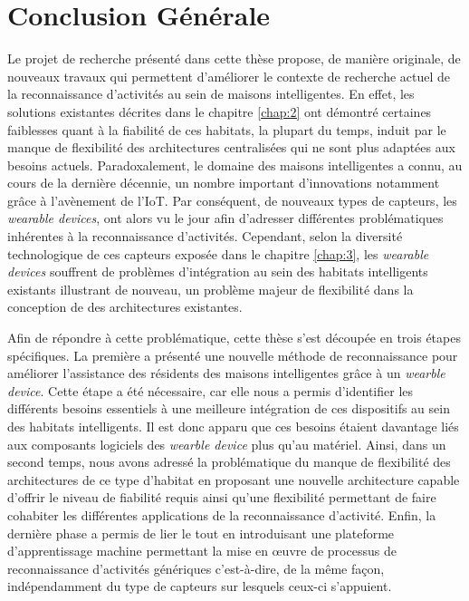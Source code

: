 \chapter{Conclusion Générale}
\label{chap:conclusion}

Le projet de recherche présenté dans cette thèse propose, de manière originale, de nouveaux travaux qui permettent d'améliorer le contexte de recherche actuel de la reconnaissance d'activités au sein de maisons intelligentes. En effet, les solutions existantes décrites dans le chapitre \ref{chap:2} ont démontré certaines faiblesses quant à la fiabilité de ces habitats, la plupart du temps, induit par le manque de flexibilité des architectures centralisées qui ne sont plus adaptées aux besoins actuels. Paradoxalement, le domaine des maisons intelligentes a connu, au cours de la dernière décennie, un nombre important d'innovations notamment grâce à l'avènement de l'\acs{IoT}. Par conséquent, de nouveaux types de capteurs, les \textit{wearable devices}, ont alors vu le jour afin d'adresser différentes problématiques inhérentes à la reconnaissance d'activités. Cependant, selon la diversité technologique de ces capteurs exposée dans le chapitre \ref{chap:3}, les \textit{wearable devices} souffrent de problèmes d'intégration au sein des habitats intelligents existants illustrant de nouveau, un problème majeur de flexibilité dans la conception de des architectures existantes.

Afin de répondre à cette problématique, cette thèse s'est découpée en trois étapes spécifiques. La première a présenté une nouvelle méthode de reconnaissance pour améliorer l'assistance des résidents des maisons intelligentes grâce à un \textit{wearble device}. Cette étape a été nécessaire, car elle nous a permis d'identifier les différents besoins essentiels à une meilleure intégration de ces dispositifs au sein des habitats intelligents. Il est donc apparu que ces besoins étaient davantage liés aux composants logiciels des \textit{wearble device} plus qu'au matériel. Ainsi, dans un second temps, nous avons adressé la problématique du manque de flexibilité des architectures de ce type d'habitat en proposant une nouvelle architecture capable d'offrir le niveau de fiabilité requis ainsi qu'une flexibilité permettant de faire cohabiter les différentes applications de la reconnaissance d'activité. Enfin, la dernière phase a permis de lier le tout en introduisant une plateforme d'apprentissage machine permettant la mise en \oe{}uvre  de processus de reconnaissance d'activités génériques c'est-à-dire, de la même façon, indépendamment du type de capteurs sur lesquels ceux-ci s'appuient.

